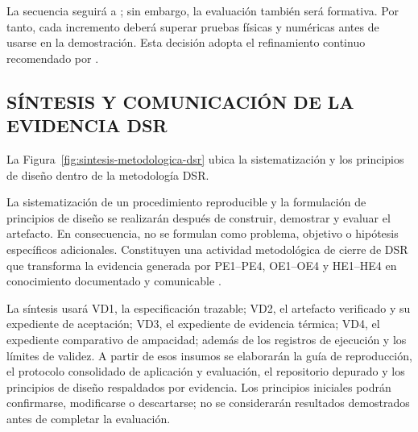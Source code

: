 La secuencia seguirá a \textcite[55--56]{peffers2007}; sin embargo, la evaluación también será formativa. Por tanto, cada incremento deberá superar pruebas físicas y numéricas antes de usarse en la demostración. Esta decisión adopta el refinamiento continuo recomendado por \textcite[198--203]{delport2024}.

\subsection{SÍNTESIS Y COMUNICACIÓN DE LA EVIDENCIA DSR}
\label{subsec:sintesis-dsr}

La Figura~\ref{fig:sintesis-metodologica-dsr} ubica la sistematización y los principios de diseño dentro de la metodología DSR.

La sistematización de un procedimiento reproducible y la formulación de principios de diseño se realizarán después de construir, demostrar y evaluar el artefacto. En consecuencia, no se formulan como problema, objetivo o hipótesis específicos adicionales. Constituyen una actividad metodológica de cierre de DSR que transforma la evidencia generada por PE1--PE4, OE1--OE4 y HE1--HE4 en conocimiento documentado y comunicable \parencites[55--56]{peffers2007}[342--350]{gregor2013}.

La síntesis usará VD1, la especificación trazable; VD2, el artefacto verificado y su expediente de aceptación; VD3, el expediente de evidencia térmica; VD4, el expediente comparativo de ampacidad; además de los registros de ejecución y los límites de validez. A partir de esos insumos se elaborarán la guía de reproducción, el protocolo consolidado de aplicación y evaluación, el repositorio depurado y los principios de diseño respaldados por evidencia. Los principios iniciales podrán confirmarse, modificarse o descartarse; no se considerarán resultados demostrados antes de completar la evaluación.

